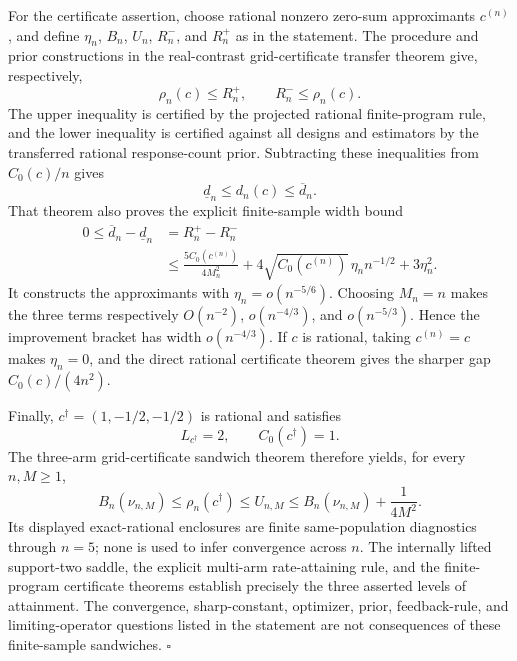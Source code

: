 For the certificate assertion, choose rational nonzero zero-sum approximants \(c^{(n)}\), and define \(\eta_n\), \(B_n\), \(U_n\), \(R_n^-\), and \(R_n^+\) as in the statement. The procedure and prior constructions in the real-contrast grid-certificate transfer theorem give, respectively,
\[
 \rho_n(c)\leq R_n^+,
 \qquad
 R_n^-\leq\rho_n(c).
\]
The upper inequality is certified by the projected rational finite-program rule, and the lower inequality is certified against all designs and estimators by the transferred rational response-count prior. Subtracting these inequalities from \(C_0(c)/n\) gives
\[
 \underline d_n\leq d_n(c)\leq\overline d_n.
\]
That theorem also proves the explicit finite-sample width bound
\[
 \begin{aligned}
 0\leq\overline d_n-\underline d_n
 &=R_n^+-R_n^-\\
 &\leq\frac{5C_0(c^{(n)})}{4M_n^2}
 +4\sqrt{C_0(c^{(n)})}\,\eta_n n^{-1/2}
 +3\eta_n^2.
 \end{aligned}
\]
It constructs the approximants with \(\eta_n=o(n^{-5/6})\). Choosing \(M_n=n\) makes the three terms respectively \(O(n^{-2})\), \(o(n^{-4/3})\), and \(o(n^{-5/3})\). Hence the improvement bracket has width \(o(n^{-4/3})\). If \(c\) is rational, taking \(c^{(n)}=c\) makes \(\eta_n=0\), and the direct rational certificate theorem gives the sharper gap \(C_0(c)/(4n^2)\).

Finally, \(c^\dagger=(1,-1/2,-1/2)\) is rational and satisfies
\[
 L_{c^\dagger}=2,
 \qquad C_0(c^\dagger)=1.
\]
The three-arm grid-certificate sandwich theorem therefore yields, for every \(n,M\geq1\),
\[
 B_n(\nu_{n,M})\leq\rho_n(c^\dagger)\leq U_{n,M}
 \leq B_n(\nu_{n,M})+\frac1{4M^2}.
\]
Its displayed exact-rational enclosures are finite same-population diagnostics through \(n=5\); none is used to infer convergence across \(n\). The internally lifted support-two saddle, the explicit multi-arm rate-attaining rule, and the finite-program certificate theorems establish precisely the three asserted levels of attainment. The convergence, sharp-constant, optimizer, prior, feedback-rule, and limiting-operator questions listed in the statement are not consequences of these finite-sample sandwiches. \(\square\)